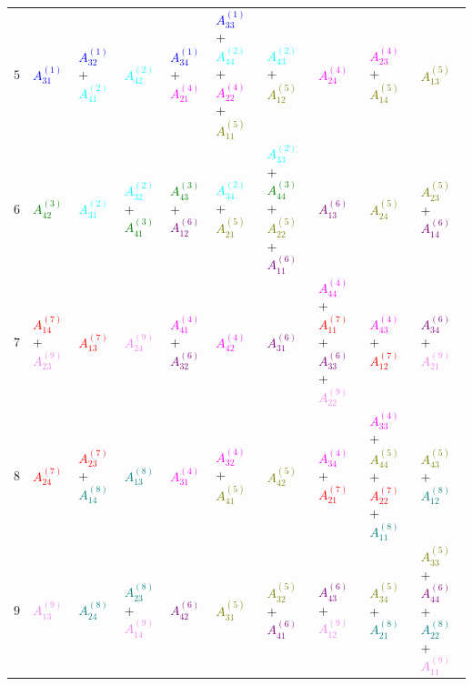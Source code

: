 \documentclass[times,namecite]{goose-article}
\begin{document}
\begin{landscape}
{\begin{tabular}{|c|C{31mm}C{31mm}C{31mm}C{31mm}C{31mm}C{31mm}C{31mm}C{31mm}C{31mm}|}
$5 $& \textcolor{blue}{$A_{31}^{(1)}$} & \textcolor{blue}{$A_{32}^{(1)}$}+\textcolor{cyan}{$A_{41}^{(2)}$} & \textcolor{cyan}{$A_{42}^{(2)}$} & \textcolor{blue}{$A_{34}^{(1)}$}+\textcolor{magenta}{$A_{21}^{(4)}$} & \textcolor{blue}{$A_{33}^{(1)}$}+\textcolor{cyan}{$A_{44}^{(2)}$}+\textcolor{magenta}{$A_{22}^{(4)}$}+\textcolor{olive}{$A_{11}^{(5)}$} & \textcolor{cyan}{$A_{43}^{(2)}$}+\textcolor{olive}{$A_{12}^{(5)}$} & \textcolor{magenta}{$A_{24}^{(4)}$} & \textcolor{magenta}{$A_{23}^{(4)}$}+\textcolor{olive}{$A_{14}^{(5)}$} & \textcolor{olive}{$A_{13}^{(5)}$} \\
$6 $& \textcolor{green}{$A_{42}^{(3)}$} & \textcolor{cyan}{$A_{31}^{(2)}$} & \textcolor{cyan}{$A_{32}^{(2)}$}+\textcolor{green}{$A_{41}^{(3)}$} & \textcolor{green}{$A_{43}^{(3)}$}+\textcolor{purple}{$A_{12}^{(6)}$} & \textcolor{cyan}{$A_{34}^{(2)}$}+\textcolor{olive}{$A_{21}^{(5)}$} & \textcolor{cyan}{$A_{33}^{(2)}$}+\textcolor{green}{$A_{44}^{(3)}$}+\textcolor{olive}{$A_{22}^{(5)}$}+\textcolor{purple}{$A_{11}^{(6)}$} & \textcolor{purple}{$A_{13}^{(6)}$} & \textcolor{olive}{$A_{24}^{(5)}$} & \textcolor{olive}{$A_{23}^{(5)}$}+\textcolor{purple}{$A_{14}^{(6)}$} \\
$7 $& \textcolor{red}{$A_{14}^{(7)}$}+\textcolor{violet}{$A_{23}^{(9)}$} & \textcolor{red}{$A_{13}^{(7)}$} & \textcolor{violet}{$A_{24}^{(9)}$} & \textcolor{magenta}{$A_{41}^{(4)}$}+\textcolor{purple}{$A_{32}^{(6)}$} & \textcolor{magenta}{$A_{42}^{(4)}$} & \textcolor{purple}{$A_{31}^{(6)}$} & \textcolor{magenta}{$A_{44}^{(4)}$}+\textcolor{red}{$A_{11}^{(7)}$}+\textcolor{purple}{$A_{33}^{(6)}$}+\textcolor{violet}{$A_{22}^{(9)}$} & \textcolor{magenta}{$A_{43}^{(4)}$}+\textcolor{red}{$A_{12}^{(7)}$} & \textcolor{purple}{$A_{34}^{(6)}$}+\textcolor{violet}{$A_{21}^{(9)}$} \\
$8 $& \textcolor{red}{$A_{24}^{(7)}$} & \textcolor{red}{$A_{23}^{(7)}$}+\textcolor{teal}{$A_{14}^{(8)}$} & \textcolor{teal}{$A_{13}^{(8)}$} & \textcolor{magenta}{$A_{31}^{(4)}$} & \textcolor{magenta}{$A_{32}^{(4)}$}+\textcolor{olive}{$A_{41}^{(5)}$} & \textcolor{olive}{$A_{42}^{(5)}$} & \textcolor{magenta}{$A_{34}^{(4)}$}+\textcolor{red}{$A_{21}^{(7)}$} & \textcolor{magenta}{$A_{33}^{(4)}$}+\textcolor{olive}{$A_{44}^{(5)}$}+\textcolor{red}{$A_{22}^{(7)}$}+\textcolor{teal}{$A_{11}^{(8)}$} & \textcolor{olive}{$A_{43}^{(5)}$}+\textcolor{teal}{$A_{12}^{(8)}$} \\
$9 $& \textcolor{violet}{$A_{13}^{(9)}$} & \textcolor{teal}{$A_{24}^{(8)}$} & \textcolor{teal}{$A_{23}^{(8)}$}+\textcolor{violet}{$A_{14}^{(9)}$} & \textcolor{purple}{$A_{42}^{(6)}$} & \textcolor{olive}{$A_{31}^{(5)}$} & \textcolor{olive}{$A_{32}^{(5)}$}+\textcolor{purple}{$A_{41}^{(6)}$} & \textcolor{purple}{$A_{43}^{(6)}$}+\textcolor{violet}{$A_{12}^{(9)}$} & \textcolor{olive}{$A_{34}^{(5)}$}+\textcolor{teal}{$A_{21}^{(8)}$} & \textcolor{olive}{$A_{33}^{(5)}$}+\textcolor{purple}{$A_{44}^{(6)}$}+\textcolor{teal}{$A_{22}^{(8)}$}+\textcolor{violet}{$A_{11}^{(9)}$} \\ \hline
\end{tabular}
}


\end{landscape}
\end{document}
